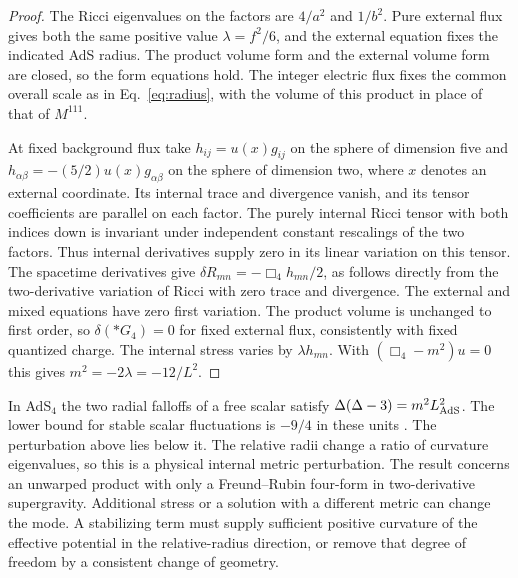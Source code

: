 \documentclass[aps,prd,reprint,onecolumn,nofootinbib,amsmath,amssymb]{revtex4-2}
\begin{document}
\begin{proof}
The Ricci eigenvalues on the factors are $4/a^2$ and $1/b^2$. Pure external flux gives both the same positive value $\lambda=f^2/6$, and the external equation fixes the indicated AdS radius. The product volume form and the external volume form are closed, so the form equations hold. The integer electric flux fixes the common overall scale as in Eq.~\eqref{eq:radius}, with the volume of this product in place of that of $M^{111}$.

At fixed background flux take $h_{ij}=u(x)g_{ij}$ on the sphere of dimension five and $h_{\alpha\beta}=-(5/2)u(x)g_{\alpha\beta}$ on the sphere of dimension two, where $x$ denotes an external coordinate. Its internal trace and divergence vanish, and its tensor coefficients are parallel on each factor. The purely internal Ricci tensor with both indices down is invariant under independent constant rescalings of the two factors. Thus internal derivatives supply zero in its linear variation on this tensor. The spacetime derivatives give $\delta R_{mn}=-\Box_4 h_{mn}/2$, as follows directly from the two-derivative variation of Ricci with zero trace and divergence. The external and mixed equations have zero first variation. The product volume is unchanged to first order, so $\delta(*G_4)=0$ for fixed external flux, consistently with fixed quantized charge. The internal stress varies by $\lambda h_{mn}$. With $(\Box_4-m^2)u=0$ this gives $m^2=-2\lambda=-12/L^2$.
\end{proof}

In AdS$_4$ the two radial falloffs of a free scalar satisfy $\Delta(\Delta-3)=m^2L_{\rm AdS}^2$. The lower bound for stable scalar fluctuations is $-9/4$ in these units \cite{BF1982}. The perturbation above lies below it. The relative radii change a ratio of curvature eigenvalues, so this is a physical internal metric perturbation. The result concerns an unwarped product with only a Freund--Rubin four-form in two-derivative supergravity. Additional stress or a solution with a different metric can change the mode. A stabilizing term must supply sufficient positive curvature of the effective potential in the relative-radius direction, or remove that degree of freedom by a consistent change of geometry.
\end{document}
